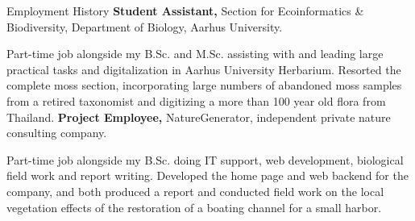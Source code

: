 \begin{rubric}{Employment History}
\entry*[2021 -- 2023]%
	\textbf{Student Assistant,} Section for Ecoinformatics \& Biodiversity, Department of Biology, Aarhus University.\par
    \pind Part-time job alongside my B.Sc. and M.Sc. assisting with and leading large practical tasks and digitalization in Aarhus University Herbarium. Resorted the complete moss section, incorporating large numbers of abandoned moss samples from a retired taxonomist and digitizing a more than 100 year old flora from Thailand.
\entry*[2020 -- 2021]%
    \textbf{Project Employee,} NatureGenerator, independent private nature consulting company.\par
    \pind Part-time job alongside my B.Sc. doing IT support, web development, biological field work and report writing. Developed the home page and web backend for the company, and both produced a report and conducted field work on the local vegetation effects of the restoration of a boating channel for a small harbor. 

\end{rubric}